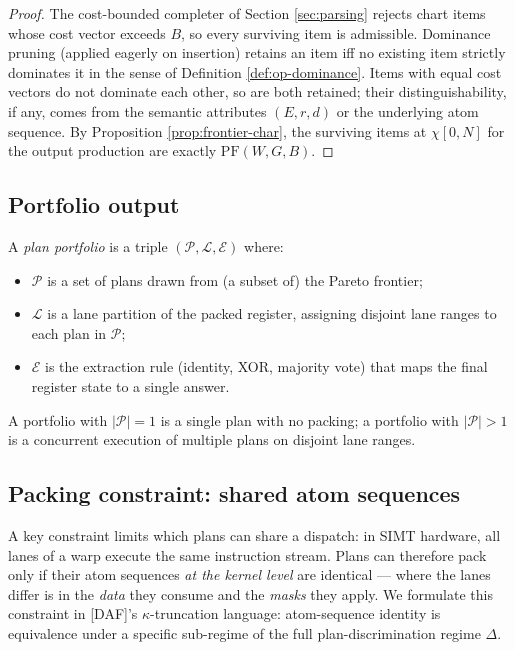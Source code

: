 \begin{proof}
  The cost-bounded completer of
  Section \ref{sec:parsing} rejects chart items whose
  cost vector exceeds $B$, so every surviving item is
  admissible. Dominance pruning (applied eagerly on
  insertion) retains an item iff no existing item
  strictly dominates it in the sense of Definition
  \ref{def:op-dominance}. Items with equal cost
  vectors do not dominate each other, so are both
  retained; their distinguishability, if any, comes
  from the semantic attributes $(E, r, d)$ or the
  underlying atom sequence. By Proposition
  \ref{prop:frontier-char}, the surviving items at
  $\chi[0, N]$ for the output production are exactly
  $\mathrm{PF}(W, G, B)$.
\end{proof}

\subsection{Portfolio output}

\begin{definition}
  \label{def:portfolio}
  A \emph{plan portfolio} is a triple
  $(\mathcal{P}, \mathcal{L}, \mathcal{E})$ where:
  \begin{itemize}[nosep]
    \item $\mathcal{P}$ is a set of plans drawn from
      (a subset of) the Pareto frontier;
    \item $\mathcal{L}$ is a lane partition of the
      packed register, assigning disjoint lane
      ranges to each plan in $\mathcal{P}$;
    \item $\mathcal{E}$ is the extraction rule
      (identity, XOR, majority vote) that maps the
      final register state to a single answer.
  \end{itemize}
\end{definition}

A portfolio with $|\mathcal{P}| = 1$ is a single
plan with no packing; a portfolio with $|\mathcal{P}|
> 1$ is a concurrent execution of multiple plans on
disjoint lane ranges.

\subsection{Packing constraint: shared atom sequences}

A key constraint limits which plans can share a
dispatch: in SIMT hardware, all lanes of a warp
execute the same instruction stream. Plans can
therefore pack only if their atom sequences
\emph{at the kernel level} are identical --- where
the lanes differ is in the \emph{data} they consume
and the \emph{masks} they apply. We formulate this
constraint in [DAF]'s $\kappa$-truncation language:
atom-sequence identity is equivalence under a
specific sub-regime of the full plan-discrimination
regime $\Delta$.

